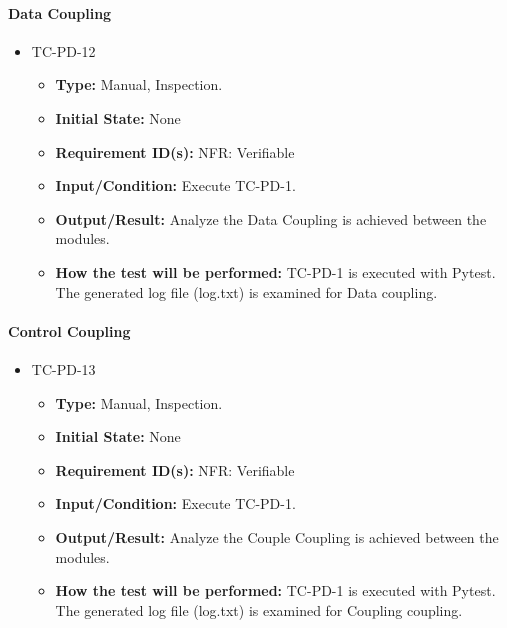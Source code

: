 \documentclass[12pt, titlepage]{article}
\begin{document}
\paragraph{Data Coupling}
\begin{itemize}
\item{TC-PD-12\\}
\begin{itemize}
\item{\textbf{Type:}} Manual, Inspection.
					
\item{\textbf{Initial State:}} None

\item{\textbf{Requirement ID(s):}} NFR: Verifiable
					
\item{\textbf{Input/Condition:}}  Execute TC-PD-1. 
					
\item{\textbf{Output/Result:}} Analyze the Data Coupling is achieved between the modules.

\item{\textbf{How the test will be performed:}}  TC-PD-1 is executed with Pytest. The generated log file (log.txt)
is examined for Data coupling.
\end{itemize}
\end{itemize}

\paragraph{Control Coupling}
\begin{itemize}
\item{TC-PD-13\\}
\begin{itemize}
\item{\textbf{Type:}} Manual, Inspection.
					
\item{\textbf{Initial State:}} None

\item{\textbf{Requirement ID(s):}} NFR: Verifiable
					
\item{\textbf{Input/Condition:}}  Execute TC-PD-1. 
					
\item{\textbf{Output/Result:}} Analyze the Couple Coupling is achieved between the modules.

\item{\textbf{How the test will be performed:}}  TC-PD-1 is executed with Pytest. The generated log file (log.txt)
is examined for Coupling coupling.
\end{itemize}
\end{itemize}
\end{document}
